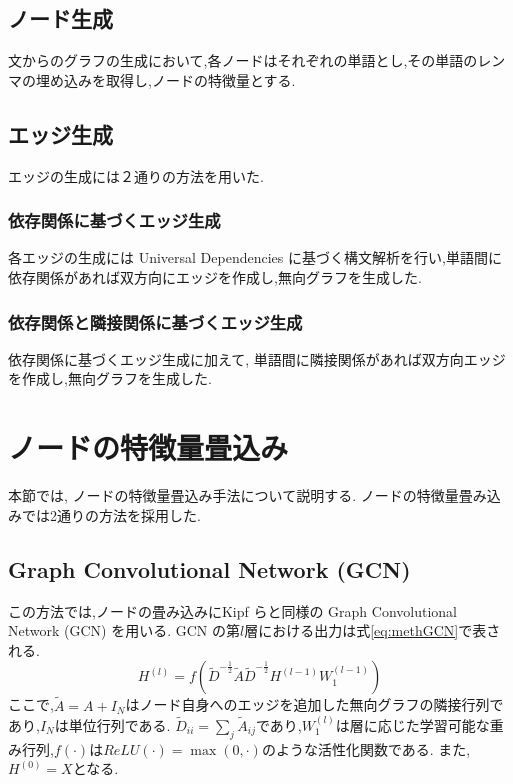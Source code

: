 \documentclass[a4j,twoside,12pt, dvipdfmx]{thesis} %
\begin{document}
\subsection{ノード生成}\label{meth:createNode}
文からのグラフの生成において,各ノードはそれぞれの単語とし,その単語のレンマの埋め込みを取得し,ノードの特徴量とする.

\subsection{エッジ生成}\label{meth:createEdge}
エッジの生成には２通りの方法を用いた.
\subsubsection{依存関係に基づくエッジ生成}
各エッジの生成には Universal Dependencies に基づく構文解析を行い,単語間に依存関係があれば双方向にエッジを作成し,無向グラフを生成した.

\subsubsection{依存関係と隣接関係に基づくエッジ生成}
依存関係に基づくエッジ生成に加えて, 単語間に隣接関係があれば双方向エッジを作成し,無向グラフを生成した.

\section{ノードの特徴量畳込み}\label{meth:convNode}
本節では, ノードの特徴量畳込み手法について説明する.
ノードの特徴量畳み込みでは2通りの方法を採用した.
\subsection{Graph Convolutional Network (GCN)}
この方法では,ノードの畳み込みにKipf ら\cite{kipf2017semi}と同様の Graph Convolutional Network (GCN) を用いる.
GCN の第$l$層における出力は式\ref{eq:methGCN}で表される.
\begin{equation}
  \label{eq:methGCN}
  H^{(l)}=f(\tilde{D}^{-\frac{1}{2}}\tilde{A}\tilde{D}^{-\frac{1}{2}}H^{(l-1)}W_{1}^{(l-1)})
\end{equation}
ここで,$\tilde{A} = A + I_{N}$はノード自身へのエッジを追加した無向グラフの隣接行列であり,$I_N$は単位行列である.
$\tilde{D}_{ii} = \sum_{j} \tilde{A}_{ij}$であり,$W_{1}^{(l)}$は層に応じた学習可能な重み行列,$f(\cdot)$は$ReLU(\cdot) = \max (0, \cdot)$のような活性化関数である.
また,$H^{(0)}=X$となる.
\end{document}
